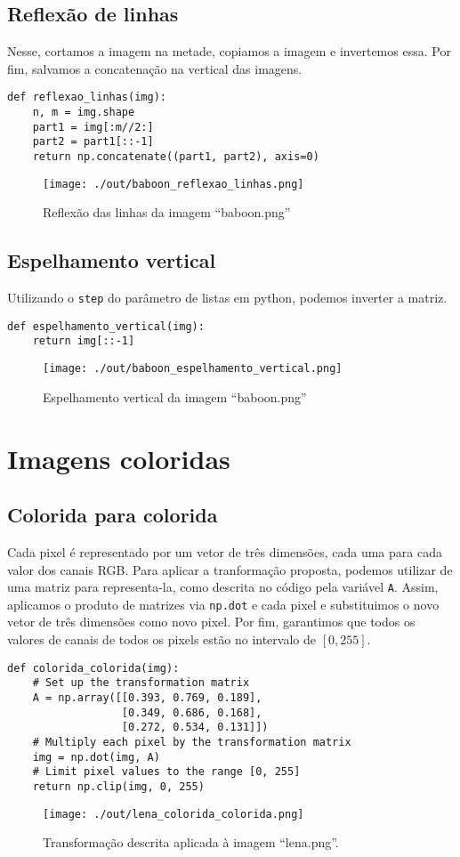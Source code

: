 \documentclass[11pt]{article}
\begin{document}
\subsection*{Reflexão de linhas}
\label{sec:orgc4b0162}
Nesse, cortamos a imagem na metade, copiamos a imagem e invertemos essa.
Por fim, salvamos a concatenação na vertical das imagens.
\begin{verbatim}
def reflexao_linhas(img):
    n, m = img.shape
    part1 = img[:m//2:]
    part2 = part1[::-1]
    return np.concatenate((part1, part2), axis=0)
\end{verbatim}
\begin{figure}[H]
\centering
\texttt{[image: ./out/baboon\_reflexao\_linhas.png]}
\caption{Reflexão das linhas da imagem ``baboon.png''}
\end{figure}

\subsection*{Espelhamento vertical}
\label{sec:orgb88dbdd}
Utilizando o \texttt{step} do parâmetro de listas em python, podemos inverter a matriz.
\begin{verbatim}
def espelhamento_vertical(img):
    return img[::-1]
\end{verbatim}
\begin{figure}[H]
\centering
\texttt{[image: ./out/baboon\_espelhamento\_vertical.png]}
\caption{Espelhamento vertical da imagem ``baboon.png''}
\end{figure}

\section*{Imagens coloridas}
\label{sec:orgd879570}
\subsection*{Colorida para colorida}
\label{sec:org2e95c14}
Cada pixel é representado por um vetor de três dimensões, cada uma para cada valor dos canais RGB.
Para aplicar a tranformação proposta, podemos utilizar de uma matriz para representa-la, como descrita no código pela variável \texttt{A}.
Assim, aplicamos o produto de matrizes via \texttt{np.dot} e cada pixel e substituimos o novo vetor de três dimensões como novo pixel.
Por fim, garantimos que todos os valores de canais de todos os pixels estão no intervalo de \([0, 255]\).
\begin{verbatim}
def colorida_colorida(img):
    # Set up the transformation matrix
    A = np.array([[0.393, 0.769, 0.189],
                  [0.349, 0.686, 0.168],
                  [0.272, 0.534, 0.131]])
    # Multiply each pixel by the transformation matrix
    img = np.dot(img, A)
    # Limit pixel values to the range [0, 255]
    return np.clip(img, 0, 255)
\end{verbatim}
\begin{figure}[H]
\centering
\texttt{[image: ./out/lena\_colorida\_colorida.png]}
\caption{Transformação descrita aplicada à imagem ``lena.png''.}
\end{figure}
\end{document}
